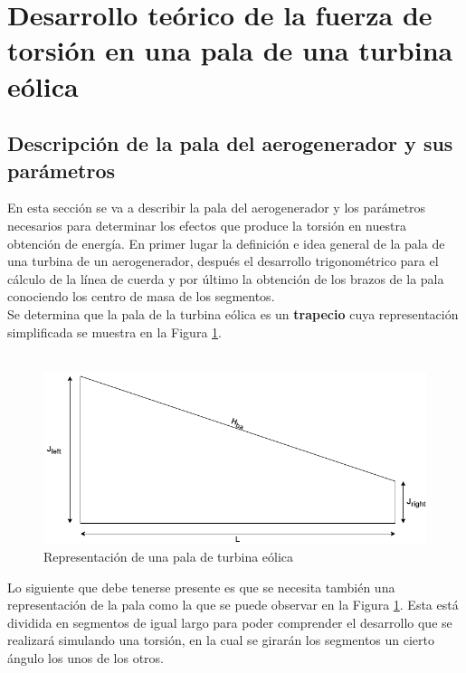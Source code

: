 \section{Desarrollo teórico de la fuerza de torsión en una pala de una turbina eólica}

\subsection{Descripción de la pala del aerogenerador y sus parámetros}

En esta sección se va a describir la pala del aerogenerador y los parámetros necesarios para determinar los efectos que produce la torsión en nuestra obtención de energía. En primer lugar la definición e idea general de la pala de una turbina de un aerogenerador, después el desarrollo trigonométrico para el cálculo de la línea de cuerda y por último la obtención de los brazos de la pala conociendo los centro de masa de los segmentos.\\


Se determina que la pala de la turbina eólica es un \textbf{trapecio} cuya representación simplificada se muestra en la Figura \ref{fig:pala_simp}. \\\\

\begin{figure}[H]
    \centering
    \includegraphics[width=1\textwidth]{images/pala simple.drawio.png}
    \caption{Representación de una pala de turbina eólica}
    \label{fig:pala_simp}
\end{figure}


Lo siguiente que debe tenerse presente es que se necesita también una representación de la pala como la que se puede observar en la Figura \ref{fig:pala_simp}. Esta está dividida en segmentos de igual largo para poder comprender el desarrollo que se realizará simulando una torsión, en la cual se girarán los segmentos un cierto ángulo los unos de los otros.

